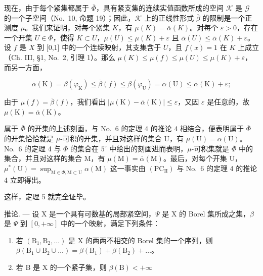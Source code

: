 现在，由于每个紧集都属于 \(\overline{\Phi}\)，具有紧支集的连续实值函数所成的空间 \(\mathcal{K}\) 是 \(\mathcal{G}\) 的一个子空间（No.~10, 命题 19）；因此，\(\mathcal{K}\) 上的正线性形式 \(\overline{\beta}\) 的限制是一个正测度 \(\mu\)。我们来证明，对每个紧集 \(K\)，有 \(\mu(K) = \overline{\alpha}(K)\)。对每个 \(\varepsilon > 0\)，存在一个开集 \(U \in \overline{\Phi}\)，使得 \(K \subset U\)，\(\mu(U) \leqslant \mu(K) + \varepsilon\) 且 \(\overline{\alpha}(U) \leqslant \overline{\alpha}(K) + \varepsilon\)。设 \(f\) 是 \(X\) 到 {[}0,1{]} 中的一个连续映射，其支集含于 \(U\)，且 \(f(x) = 1\) 在 \(K\) 上成立（Ch. III, §1, No.~2, 引理 1）。那么 \(\mu(K) \leqslant \mu(f) \leqslant \mu(U) \leqslant \mu(K) + \varepsilon\)，而另一方面，

\[
\overline {{\alpha}} (\mathrm{K}) = \beta (\varphi_ {\mathrm{K}}) \leqslant \overline {{\beta}} (f) \leqslant \beta (\varphi_ {\mathrm{U}}) = \overline {{\alpha}} (\mathrm{U}) \leqslant \overline {{\alpha}} (\mathrm{K}) + \varepsilon ;
\]

由于 \(\mu(f) = \overline{\beta}(f)\)，我们看出 \(|\mu(\mathrm{K}) - \overline{\alpha}(\mathrm{K})| \leqslant \varepsilon\)，又因 \(\varepsilon\) 是任意的，故 \(\mu(\mathrm{K}) = \overline{\alpha}(\mathrm{K})\)。

属于 \(\overline{\Phi}\) 的开集的上述刻画，与 No.~6 的定理 4 的推论 4 相结合，便表明属于 \(\overline{\Phi}\) 的开集恰恰就是 \(\mu\)-可积的开集，并且对这样的集合 U，有 \(\mu(\mathrm{U}) = \overline{\alpha}(\mathrm{U})\)。No.~6 的定理 4 与 \(\overline{\Phi}\) 的集合在 \(5^{\circ}\) 中给出的刻画进而表明，\(\mu\)-可积集就是 \(\overline{\Phi}\) 中的集合，并且对这样的集合 M，有 \(\mu(\mathrm{M}) = \overline{\alpha}(\mathrm{M})\)。最后，对每个开集 U，\(\mu^{*}(\mathrm{U}) = \sup_{\mathrm{M} \in \Phi, \mathrm{M} \subset \mathrm{U}} \alpha(\mathrm{M})\) 这一事实由 \((\mathrm{PC}_{\mathrm{II}})\) 与 No.~6 的定理 4 的推论 4 立即得出。

这样，定理 5 就完全证毕。

推论. --- 设 X 是一个具有可数基的局部紧空间，\(\Psi\) 是 X 的 Borel 集所成之集，\(\beta\) 是 \(\Psi\) 到 \([0,+\infty]\) 中的一个映射，满足下列条件：

\begin{enumerate}
\def\labelenumi{(\roman{enumi})}
\item
  若 \((\mathrm{B}_1, \mathrm{B}_2, \ldots)\) 是 X 的两两不相交的 Borel 集的一个序列，则 \(\beta(\mathrm{B}_1 \cup \mathrm{B}_2 \cup \ldots) = \beta(\mathrm{B}_1) + \beta(\mathrm{B}_2) + \ldots\)。
\item
  若 B 是 X 的一个紧子集，则 \(\beta (\mathrm{B}) < +\infty\)
\end{enumerate}

